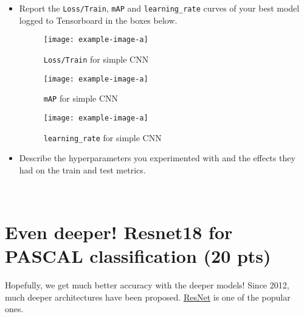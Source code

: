 \documentclass[11pt,addpoints,answers]{exam}
\numberwithin{equation}{section} %
\numberwithin{figure}{section} %
\numberwithin{table}{section} %
\begin{document}
\begin{itemize}
\begin{itemize}
        \item Report the \texttt{Loss/Train}, \texttt{mAP} and \texttt{learning\_rate} curves of your best model logged to Tensorboard in the boxes below.
        
        \begin{figure}[H]
            \centering
            \texttt{[image: example-image-a]}
            \caption{\texttt{Loss/Train} for simple CNN}
            \label{fig:q1_2_loss}
        \end{figure}
        
        \begin{figure}[H]
            \centering
            \texttt{[image: example-image-a]}
            \caption{\texttt{mAP} for simple CNN}
            \label{fig:q1_2_map}
        \end{figure}
        
        \begin{figure}[H]
            \centering
            \texttt{[image: example-image-a]}
            \caption{\texttt{learning\_rate} for simple CNN}
            \label{fig:q1_2_lr}
        \end{figure}
        
        \item Describe the hyperparameters you experimented with and the effects they had on the train and test metrics.

        \begin{solution}
        \\
        \end{solution}
    \end{itemize}
\end{itemize}

\clearpage

\section{Even deeper! Resnet18 for PASCAL classification (20 pts)}

Hopefully, we get much better accuracy with the deeper models! Since 2012, much deeper architectures have been proposed. \href{https://arxiv.org/abs/1512.03385}{ResNet} is one of the popular ones.
\end{document}

